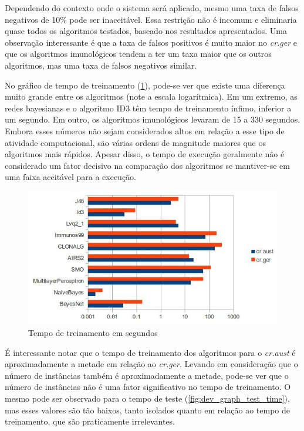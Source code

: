 Dependendo do contexto onde o sistema será aplicado, mesmo uma taxa de falsos negativos de 10\% pode ser inaceitável. Essa restrição não é incomum e eliminaria quase todos os algoritmos testados, baseado nos resultados apresentados. Uma observação interessante é que a taxa de falsos positivos é muito maior no \emph{cr.ger} e que os algoritmos imunológicos tendem a ter um taxa maior que os outros algoritmos, mas uma taxa de falsos negativos similar.

No gráfico de tempo de treinamento (\ref{fig:dev_graph_train_time}), pode-se ver que existe uma diferença muito grande entre os algoritmos (note a escala logarítmica). Em um extremo, as redes bayesianas e o algoritmo ID3 têm tempo de treinamento ínfimo, inferior a um segundo. Em outro, os algoritmos imunológicos levaram de 15 a 330 segundos. Embora esses números não sejam considerados altos em relação a esse tipo de atividade computacional, são várias ordens de magnitude maiores que os algoritmos mais rápidos. Apesar disso, o tempo de execução geralmente não é considerado um fator decisivo na comparação dos algoritmos se mantiver-se em uma faixa aceitável para a execução.

\begin{figure}[h]
    \vspace{0.5cm}
    \centering
    \caption{Tempo de treinamento em segundos}
    \label{fig:dev_graph_train_time}
    \includegraphics[width=1\textwidth]{img/graph_train_time.jpg}
\end{figure}

É interessante notar que o tempo de treinamento dos algoritmos para o \emph{cr.aust} é aproximadamente a metade em relação ao \emph{cr.ger}. Levando em consideração que o número de instâncias também é aproximadamente a metade, pode-se ver que o número de instâncias não é uma fator significativo no tempo de treinamento. O mesmo pode ser observado para o tempo de teste (\ref{fig:dev_graph_test_time}), mas esses valores são tão baixos, tanto isolados quanto em relação ao tempo de treinamento, que são praticamente irrelevantes.

